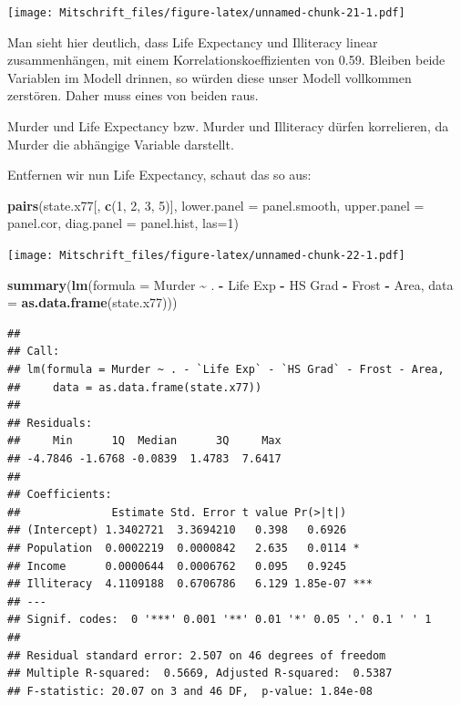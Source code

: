 \documentclass[
]{article}
\newenvironment{Shaded}{\begin{snugshade}}{\end{snugshade}}
\newcommand{\AttributeTok}[1]{\textcolor[rgb]{0.13,0.29,0.53}{#1}}
\newcommand{\DecValTok}[1]{\textcolor[rgb]{0.00,0.00,0.81}{#1}}
\newcommand{\FunctionTok}[1]{\textcolor[rgb]{0.13,0.29,0.53}{\textbf{#1}}}
\newcommand{\NormalTok}[1]{#1}
\newcommand{\SpecialCharTok}[1]{\textcolor[rgb]{0.81,0.36,0.00}{\textbf{#1}}}
\newcommand{\StringTok}[1]{\textcolor[rgb]{0.31,0.60,0.02}{#1}}
\begin{document}
\texttt{[image: Mitschrift\_files/figure-latex/unnamed-chunk-21-1.pdf]}

Man sieht hier deutlich, dass Life Expectancy und Illiteracy linear
zusammenhängen, mit einem Korrelationskoeffizienten von 0.59. Bleiben
beide Variablen im Modell drinnen, so würden diese unser Modell
vollkommen zerstören. Daher muss eines von beiden raus.

Murder und Life Expectancy bzw. Murder und Illiteracy dürfen
korrelieren, da Murder die abhängige Variable darstellt.

Entfernen wir nun Life Expectancy, schaut das so aus:

\begin{Shaded}
\begin{Highlighting}[]
\FunctionTok{pairs}\NormalTok{(state.x77[, }\FunctionTok{c}\NormalTok{(}\DecValTok{1}\NormalTok{, }\DecValTok{2}\NormalTok{, }\DecValTok{3}\NormalTok{, }\DecValTok{5}\NormalTok{)], }\AttributeTok{lower.panel =}\NormalTok{ panel.smooth, }\AttributeTok{upper.panel =}\NormalTok{ panel.cor,}
\AttributeTok{diag.panel =}\NormalTok{ panel.hist, }\AttributeTok{las=}\DecValTok{1}\NormalTok{)}
\end{Highlighting}
\end{Shaded}

\texttt{[image: Mitschrift\_files/figure-latex/unnamed-chunk-22-1.pdf]}

\clearpage

\begin{Shaded}
\begin{Highlighting}[]
\FunctionTok{summary}\NormalTok{(}\FunctionTok{lm}\NormalTok{(}\AttributeTok{formula =}\NormalTok{ Murder }\SpecialCharTok{\textasciitilde{}}\NormalTok{ .  }\SpecialCharTok{{-}} \StringTok{\textasciigrave{}}\AttributeTok{Life Exp}\StringTok{\textasciigrave{}} \SpecialCharTok{{-}} \StringTok{\textasciigrave{}}\AttributeTok{HS Grad}\StringTok{\textasciigrave{}} \SpecialCharTok{{-}}\NormalTok{ Frost }\SpecialCharTok{{-}}\NormalTok{ Area,}
           \AttributeTok{data =} \FunctionTok{as.data.frame}\NormalTok{(state.x77)))}
\end{Highlighting}
\end{Shaded}

\begin{verbatim}
## 
## Call:
## lm(formula = Murder ~ . - `Life Exp` - `HS Grad` - Frost - Area, 
##     data = as.data.frame(state.x77))
## 
## Residuals:
##     Min      1Q  Median      3Q     Max 
## -4.7846 -1.6768 -0.0839  1.4783  7.6417 
## 
## Coefficients:
##              Estimate Std. Error t value Pr(>|t|)    
## (Intercept) 1.3402721  3.3694210   0.398   0.6926    
## Population  0.0002219  0.0000842   2.635   0.0114 *  
## Income      0.0000644  0.0006762   0.095   0.9245    
## Illiteracy  4.1109188  0.6706786   6.129 1.85e-07 ***
## ---
## Signif. codes:  0 '***' 0.001 '**' 0.01 '*' 0.05 '.' 0.1 ' ' 1
## 
## Residual standard error: 2.507 on 46 degrees of freedom
## Multiple R-squared:  0.5669, Adjusted R-squared:  0.5387 
## F-statistic: 20.07 on 3 and 46 DF,  p-value: 1.84e-08
\end{verbatim}
\end{document}
